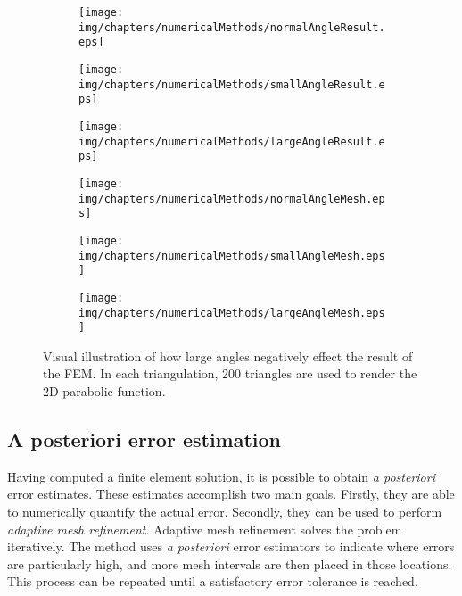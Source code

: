 \begin{figure}[htb]
        \centering
        \begin{subfigure}[b]{0.3\textwidth}
                \texttt{[image: img/chapters/numericalMethods/normalAngleResult.eps]}
        \end{subfigure}
        \begin{subfigure}[b]{0.3\textwidth}
                \texttt{[image: img/chapters/numericalMethods/smallAngleResult.eps]}
        \end{subfigure}
        \begin{subfigure}[b]{0.3\textwidth}
                \texttt{[image: img/chapters/numericalMethods/largeAngleResult.eps]}
        \end{subfigure}
        \begin{subfigure}[b]{0.3\textwidth}
                \texttt{[image: img/chapters/numericalMethods/normalAngleMesh.eps]}
                \caption{}
                \label{fig:normal}
        \end{subfigure}
        \begin{subfigure}[b]{0.3\textwidth}
                \texttt{[image: img/chapters/numericalMethods/smallAngleMesh.eps]}
                \caption{}  
                \label{fig:small}              
        \end{subfigure}
        \begin{subfigure}[b]{0.3\textwidth}
                \texttt{[image: img/chapters/numericalMethods/largeAngleMesh.eps]}
                \caption{}                
                \label{fig:large}
        \end{subfigure}
        \caption[Illustration how large angles in element negatively effect FEM results]{Visual illustration of how large angles negatively effect the result of the FEM. In each triangulation, 200 triangles are used to render the 2D parabolic function.}
        \label{fig:meshShape}
\end{figure}

\subsection{A posteriori error estimation}
\label{subsec:aPosterioriErrorEstimation}
Having computed a finite element solution, it is possible to obtain \emph{a posteriori} error estimates. These estimates accomplish two main goals. Firstly, they are able to numerically quantify the actual error. Secondly, they can be used to perform \emph{adaptive mesh refinement}. Adaptive mesh refinement solves the problem iteratively. The method uses \emph{a posteriori} error estimators to indicate where errors are particularly high, and more mesh intervals are then placed in those locations. This process can be repeated until a satisfactory error tolerance is reached. 

